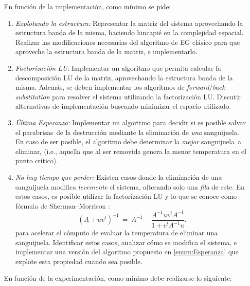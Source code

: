 \documentclass[11pt, a4paper]{article}
\newcommand{\atacante}{sanguijuela}
\newcommand{\objeto}{parabrisas}
\begin{document}
En funci\'on de la implementaci\'on, como m\'inimo se pide:
\begin{enumerate}
\item \textit{Explotando la estructura:} Representar la matriz del sistema aprovechando la estructura banda de la misma, haciendo hincapi\'e en la complejidad espacial. Realizar las modificaciones necesarias del algoritmo de EG clásico para que aproveche la estructura banda de la matriz, e implementarlo. \label{enum:EGbanda}
\item \textit{Factorización LU:} Implementar un algoritmo que permita calcular la descomposición LU de la matriz, aprovechando la estructura banda de la misma. Además, se deben implementar los algoritmos de \textit{forward}/\textit{back substitution} para resolver el sistema utilizando la factorización LU. Discutir alternativas de implementación buscando minimizar el espacio utilizado. \label{enum:LU}
\item \textit{Última Esperanza:} Implementar un algoritmo para decidir si es posible salvar el \objeto\ de la destrucción mediante la eliminaci\'on de \emph{una} \atacante. En caso de ser posible, el algoritmo debe determinar la \emph{mejor} \atacante\ a eliminar, (i.e., aquella que al ser removida genera la menor temperatura en el punto cr\'itico). \label{enum:Esperanza}
\item \textit{No hay tiempo que perder:} Existen casos donde la eliminación de una sanguijuela modifica \textit{levemente} el sistema, alterando solo una \emph{fila} de este. En estos casos, es posible utilizar la factorizaci\'on LU y lo que se conoce como fórmula de Sherman–Morrison \cite{ShermanMorrison}:\\
\begin{equation}
	(A+ uv^t)^{-1} \ =\ A^{-1} - \frac{ A^{-1} u v^t A^{-1} }{1+v^t A^{-1}u}.\label{eq:sm}
\end{equation}
para acelerar el cómputo de evaluar la temperatura de eliminar una \atacante. Identificar estos casos, analizar cómo se modifica el sistema, e implementar una versión del algoritmo propuesto en \ref{enum:Esperanza} que explote esta propiedad cuando sea posible. \label{enum:SM}
\end{enumerate}
\vspace*{-0.3cm}
En funci\'on de la experimentaci\'on, como m\'inimo debe realizarse lo siguiente:
\end{document}
